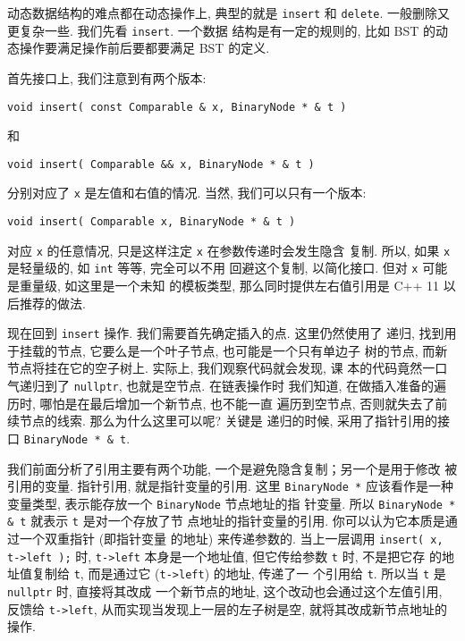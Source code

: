 \documentclass[a4paper]{ctexart}
\theoremstyle{definition}
\theoremstyle{definition}
\begin{document}
动态数据结构的难点都在动态操作上, 典型的就是 \verb|insert| 和
\verb|delete|. 一般删除又更复杂一些. 我们先看 \verb|insert|. 一个数据
结构是有一定的规则的, 比如 BST 的动态操作要满足操作前后要都要满足 BST
的定义.


首先接口上, 我们注意到有两个版本:
\begin{verbatim}
void insert( const Comparable & x, BinaryNode * & t )
\end{verbatim}
和
\begin{verbatim}
void insert( Comparable && x, BinaryNode * & t )
\end{verbatim}
分别对应了 \verb|x| 是左值和右值的情况. 当然, 我们可以只有一个版本:
\begin{verbatim}
void insert( Comparable x, BinaryNode * & t )
\end{verbatim}
对应 \verb|x| 的任意情况, 只是这样注定 \verb|x| 在参数传递时会发生隐含
复制. 所以, 如果 \verb|x| 是轻量级的, 如 \verb|int| 等等, 完全可以不用
回避这个复制, 以简化接口. 但对 \verb|x| 可能是重量级, 如这里是一个未知
的模板类型, 那么同时提供左右值引用是 C++ 11 以后推荐的做法.

现在回到 \verb|insert| 操作. 我们需要首先确定插入的点. 这里仍然使用了
递归, 找到用于挂载的节点, 它要么是一个叶子节点, 也可能是一个只有单边子
树的节点, 而新节点将挂在它的空子树上. 实际上, 我们观察代码就会发现, 课
本的代码竟然一口气递归到了 \verb|nullptr|, 也就是空节点. 在链表操作时
我们知道, 在做插入准备的遍历时, 哪怕是在最后增加一个新节点, 也不能一直
遍历到空节点, 否则就失去了前续节点的线索. 那么为什么这里可以呢? 关键是
递归的时候, 采用了指针引用的接口 \verb|BinaryNode * & t|.

我们前面分析了引用主要有两个功能, 一个是避免隐含复制；另一个是用于修改
被引用的变量. 指针引用, 就是指针变量的引用. 这里 \verb|BinaryNode *|
应该看作是一种变量类型, 表示能存放一个 \verb|BinaryNode| 节点地址的指
针变量. 所以 \verb|BinaryNode * & t| 就表示 \verb|t| 是对一个存放了节
点地址的指针变量的引用. 你可以认为它本质是通过一个双重指针 (即指针变量
的地址) 来传递参数的. 当上一层调用 \verb|insert( x, t->left );| 时,
\verb|t->left| 本身是一个地址值, 但它传给参数 \verb|t| 时, 不是把它存
的地址值复制给 \verb|t|, 而是通过它 (\verb|t->left|) 的地址, 传递了一
个引用给 \verb|t|. 所以当 \verb|t| 是 \verb|nullptr| 时, 直接将其改成
一个新节点的地址, 这个改动也会通过这个左值引用, 反馈给 \verb|t->left|,
从而实现当发现上一层的左子树是空, 就将其改成新节点地址的操作. 
\end{document}
